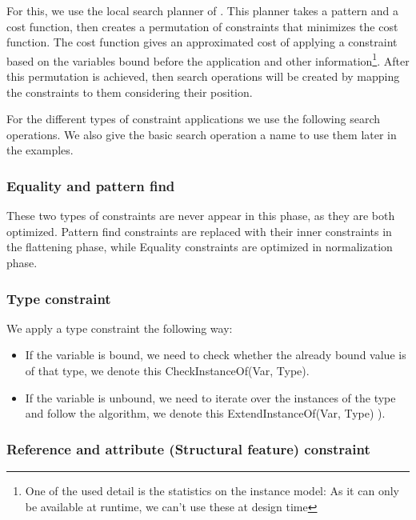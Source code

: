 For this, we use the local search planner of \viatra{}.
This planner takes a pattern and a cost function, then creates a permutation of constraints that minimizes the cost function. 
The cost function gives an approximated cost of applying a constraint based on the variables bound before the application and other information\footnote{One of the used detail is the statistics on the instance model: As it can only be available at runtime, we can't use these at design time}. 
After this permutation is achieved, then search operations will be created by mapping the constraints to them considering their position.

For the different types of constraint applications we use the following search operations. We also give the basic search operation a name to use them later in the examples.


\subsubsection{Equality and pattern find}
These two types of constraints are never appear in this phase, as they are both optimized. Pattern find constraints are replaced with their inner constraints in the flattening phase, while Equality constraints are optimized in normalization phase.


\subsubsection{Type constraint}
We apply a type constraint the following way:

\begin{itemize}
\item If the variable is bound, we need to check whether the already bound value is of that type, we denote this CheckInstanceOf(Var, Type).
\item If the variable is unbound, we need to iterate over the instances of the type and follow the algorithm, we denote this ExtendInstanceOf(Var, Type) ).
\end{itemize}


\subsubsection{Reference and attribute (Structural feature) constraint}

